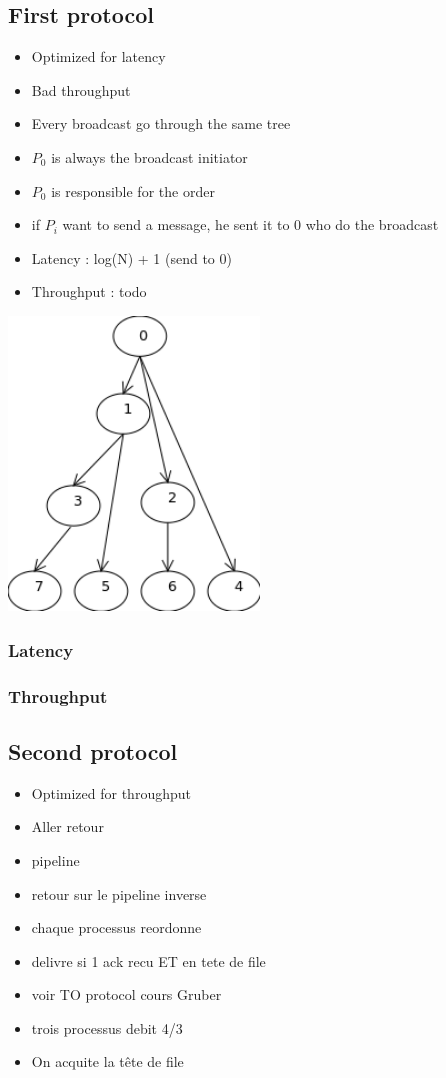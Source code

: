 \documentclass[a4paper]{article}
\begin{document}
\subsection*{First protocol}
\begin{itemize}
    \item Optimized for latency
    \item Bad throughput
    \item Every broadcast go through the same tree
    \item $P_0$ is always the broadcast initiator
    \item $P_0$ is responsible for the order
    \item if $P_i$ want to send a message, he sent it to 0 who do the broadcast
    \item Latency : log(N) + 1 (send to 0)
    \item Throughput : todo
\end{itemize}
\includegraphics[width=0.5\textwidth]{latencyTO.png}

\subsubsection*{Latency}

\subsubsection*{Throughput}

\subsection*{Second protocol}
\begin{itemize}
    \item Optimized for throughput
    \item Aller retour
    \item pipeline
    \item retour sur le pipeline inverse
    \item chaque processus reordonne
    \item delivre si 1 ack recu ET en tete de file
    \item voir TO protocol cours Gruber
    \item trois processus debit 4/3
    \item On acquite la tête de file
\end{itemize}
\end{document}
